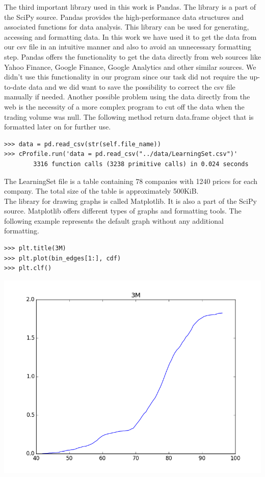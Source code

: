 \documentclass[
  twoside,
  12pt, a4paper,
  footinclude=true,
  headinclude=true,
  cleardoublepage=empty
]{article}
\begin{document}
The third important library used in this work is Pandas. The library is a part of the SciPy source. Pandas provides the high-performance data structures and associated functions for data analysis. This library can be used for generating, accessing and formatting data. In this work we have used it to get the data from our csv file in an intuitive manner and also to avoid an unnecessary formatting step. Pandas offers the functionality to get the data directly from web sources like Yahoo Finance, Google Finance, Google Analytics and other similar sources. We didn't use this functionality in our program since our task did not require the up-to-date data and we did want to save the possibility to correct the csv file manually if needed. Another possible problem using the data directly from the web is the necessity of a more complex program to cut off the data when the trading volume was null.  The following method return data.frame object that is formatted later on for further use.
\begin{verbatim}
>>> data = pd.read_csv(str(self.file_name))
>>> cProfile.run('data = pd.read_csv("../data/LearningSet.csv")'
        3316 function calls (3238 primitive calls) in 0.024 seconds
\end{verbatim}
The LearningSet file is a table containing 78 companies with 1240 prices for each company. The total size of the table is approximately 500KiB.\\ The library for drawing graphs is called Matplotlib. It is also a part of the SciPy source. Matplotlib offers different types of graphs and formatting tools. The following example represents the default graph without any additional formatting.
\begin{verbatim}
>>> plt.title(3M)
>>> plt.plot(bin_edges[1:], cdf)
>>> plt.clf()
\end{verbatim}
\includegraphics[scale=0.75]{PythonPlotExample.png} \\
\end{document}
